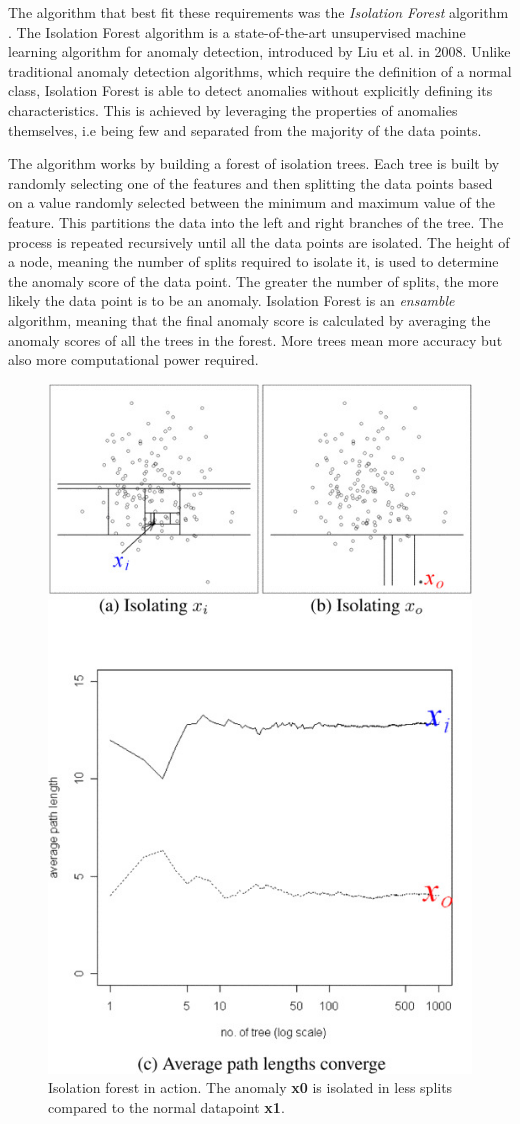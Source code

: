 \documentclass[futureinternet,article,submit,pdftex,moreauthors]{Definitions/mdpi}
\begin{document}
The algorithm that best fit these requirements was the \textit{Isolation Forest} algorithm \cite{IsolationForestLiu}. The Isolation Forest algorithm is a state-of-the-art unsupervised machine learning algorithm for anomaly detection, introduced by Liu et al. in 2008. 
Unlike traditional anomaly detection algorithms, which require the definition of a normal class, Isolation Forest is able to detect anomalies without explicitly defining its characteristics.
This is achieved by leveraging the properties of anomalies themselves, i.e being few and separated from the majority of the data points. 

The algorithm works by building a forest of isolation trees. Each tree is built by randomly selecting one of the features and then splitting the data points based on a value randomly selected between the minimum and maximum value of the feature. This partitions the data into the 
left and right branches of the tree. The process is repeated recursively until all the data points are isolated. The height of a node, meaning the number of splits required to isolate it, is used to determine the anomaly score of the data point. The greater the number of splits, the more likely the data point is to be an anomaly.
Isolation Forest is an \textit{ensamble} algorithm, meaning that the final anomaly score is calculated by averaging the anomaly scores of all the trees in the forest. More trees mean more accuracy but also more computational power required.

\begin{figure}[H]
	\includegraphics[width=6 cm]{img/IsolationForest.jpg}
	\caption{Isolation forest in action. The anomaly \textbf{x0} is isolated in less splits compared to the normal datapoint \textbf{x1}\cite{IsolationForestLiu}.}
	\label{fig:IsolationForest}
\end{figure}   
\unskip
\end{document}
